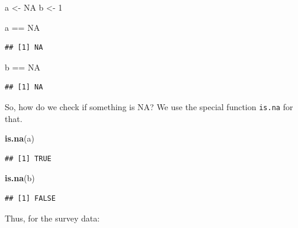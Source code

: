 \documentclass[]{tufte-book}
\newenvironment{Shaded}{}{}
\newcommand{\DataTypeTok}[1]{\textcolor[rgb]{0.56,0.13,0.00}{#1}}
\newcommand{\DecValTok}[1]{\textcolor[rgb]{0.25,0.63,0.44}{#1}}
\newcommand{\KeywordTok}[1]{\textcolor[rgb]{0.00,0.44,0.13}{\textbf{#1}}}
\newcommand{\NormalTok}[1]{#1}
\newcommand{\OperatorTok}[1]{\textcolor[rgb]{0.40,0.40,0.40}{#1}}
\newcommand{\OtherTok}[1]{\textcolor[rgb]{0.00,0.44,0.13}{#1}}
\newcommand{\StringTok}[1]{\textcolor[rgb]{0.25,0.44,0.63}{#1}}
\begin{document}
\begin{Shaded}
\begin{Highlighting}[]
\NormalTok{a <-}\StringTok{ }\OtherTok{NA}
\NormalTok{b <-}\StringTok{ }\DecValTok{1}

\NormalTok{a }\OperatorTok{==}\StringTok{ }\OtherTok{NA}
\end{Highlighting}
\end{Shaded}

\begin{verbatim}
## [1] NA
\end{verbatim}

\begin{Shaded}
\begin{Highlighting}[]
\NormalTok{b }\OperatorTok{==}\StringTok{ }\OtherTok{NA}
\end{Highlighting}
\end{Shaded}

\begin{verbatim}
## [1] NA
\end{verbatim}

So, how do we check if something is NA? We use the special function \texttt{is.na} for that.

\begin{Shaded}
\begin{Highlighting}[]
\KeywordTok{is.na}\NormalTok{(a)}
\end{Highlighting}
\end{Shaded}

\begin{verbatim}
## [1] TRUE
\end{verbatim}

\begin{Shaded}
\begin{Highlighting}[]
\KeywordTok{is.na}\NormalTok{(b)}
\end{Highlighting}
\end{Shaded}

\begin{verbatim}
## [1] FALSE
\end{verbatim}

Thus, for the survey data:

\begin{Shaded}
\end{Shaded}
\end{document}
